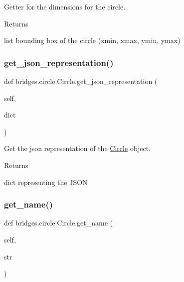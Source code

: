 Getter for the dimensions for the circle. 

\begin{DoxyReturn}{Returns}


list bounding box of the circle (xmin, xmax, ymin, ymax) 
\end{DoxyReturn}
\mbox{\label{classbridges_1_1circle_1_1_circle_a7a1be40bcd6028dab0a5bcab6e69c355}} 
\subsubsection{\texorpdfstring{get\+\_\+json\+\_\+representation()}{get\_json\_representation()}}
{\footnotesize\ttfamily def bridges.\+circle.\+Circle.\+get\+\_\+json\+\_\+representation (\begin{DoxyParamCaption}\item[{}]{self,  }\item[{}]{dict }\end{DoxyParamCaption})}



Get the json representation of the \mbox{\hyperlink{classbridges_1_1circle_1_1_circle}{Circle}} object. 

\begin{DoxyReturn}{Returns}


dict representing the J\+S\+ON 
\end{DoxyReturn}
\mbox{\label{classbridges_1_1circle_1_1_circle_acacc4d8cc5f2db86cfcba61f31652003}} 
\subsubsection{\texorpdfstring{get\+\_\+name()}{get\_name()}}
{\footnotesize\ttfamily def bridges.\+circle.\+Circle.\+get\+\_\+name (\begin{DoxyParamCaption}\item[{}]{self,  }\item[{}]{str }\end{DoxyParamCaption})}



